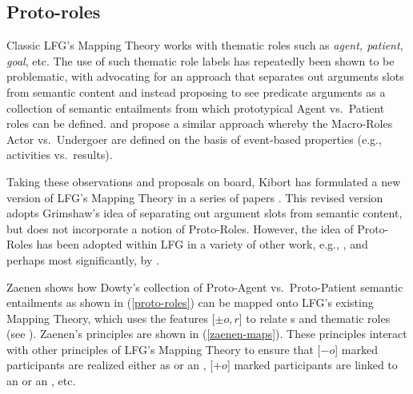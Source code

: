 \documentclass[output=paper,hidelinks]{langscibook}
\begin{document}
\subsection{Proto-roles}

Classic LFG's Mapping Theory works with thematic roles such as {\em agent, patient},
{\em goal}, etc.  The use of such thematic role labels has repeatedly been shown
to be problematic, with \citet{Grimshaw90} advocating for an approach that
  separates out arguments slots from semantic content and \citet{Dowty1991}
 instead proposing to see predicate arguments as a collection of semantic
 entailments from which prototypical Agent vs.~Patient roles
 can be defined.    \citet{vanvalin91} and \citet{VanValin1997} propose a similar approach
 whereby the Macro-Roles Actor vs.~Undergoer are defined on the basis 
of event-based properties (e.g., activities vs.~results). 
 
Taking these observations and proposals on board,  Kibort has  formulated a new version of LFG's Mapping
Theory in a series of papers \citep{Kibort2007,kibort13,kibort14,KM15}. This revised version adopts Grimshaw's
idea of separating out argument slots from semantic content, but  does not
incorporate a notion of Proto-Roles. However, the idea of   
Proto-Roles has been adopted within LFG in a variety of other work,  e.g.,
\citet{alsina1996the-role}, \citet{Asudeh01} and perhaps most significantly, by 
\citet{zaenen93}.

Zaenen shows how Dowty's collection of Proto-Agent
vs.~Proto-Patient semantic entailments as shown in (\ref{proto-roles}) can be mapped onto LFG's
existing Mapping Theory, which uses the features  [$\pm o,r$] to relate
{\GF}s and thematic roles (see ). Zaenen's principles are shown in
(\ref{zaenen-maps}). These principles interact with other principles of LFG's
Mapping Theory  to ensure
that [$-o$] marked participants are  realized either as \SUBJ  or an \OBL, [$+o$]
marked participants are linked to  an \OBJ or an \OBJTHETA, etc. 


\end{document}
